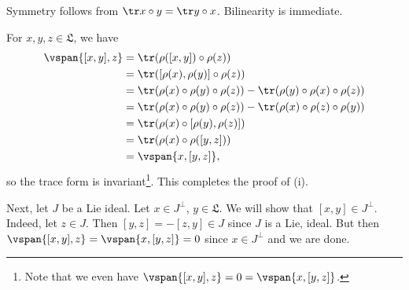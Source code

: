 Symmetry follows from $\tr x \circ y = \tr y \circ x$. Bilinearity is
immediate.

For $x, y, z \in \mathfrak{L}$, we have
\begin{align*}
	\vspan{[x, y], z} &= \tr(\rho([x, y]) \circ \rho(z))\\
	&= \tr([\rho(x), \rho(y)] \circ \rho(z))\\
	&= \tr(\rho(x)\circ\rho(y)\circ\rho(z)) - \tr(\rho(y)\circ\rho(x)\circ\rho(z))\\
	&= \tr(\rho(x)\circ\rho(y)\circ\rho(z)) - \tr(\rho(x)\circ\rho(z)\circ\rho(y))\\
	&= \tr(\rho(x) \circ [\rho(y), \rho(z)])\\
	&= \tr(\rho(x) \circ \rho([y, z]))\\
	&= \vspan{x, [y, z]},
\end{align*}
so the trace form is invariant\footnote{Note that we even have $\vspan{[x, y], z} = 0 = \vspan{x, [y, z]}$.}.
This completes the proof of (i).

Next, let $J$ be a Lie ideal. Let $x \in J^\perp$, $y \in \mathfrak{L}$.
We will show that $[x, y] \in J^\perp$. Indeed, let $z \in J$.
Then  $[y, z] = -[z, y] \in J$ since $J$ is a Lie, ideal. But then
$\vspan{[x, y], z} = \vspan{x, [y, z]} = 0$ since $x \in J^\perp$ and we are
done.
